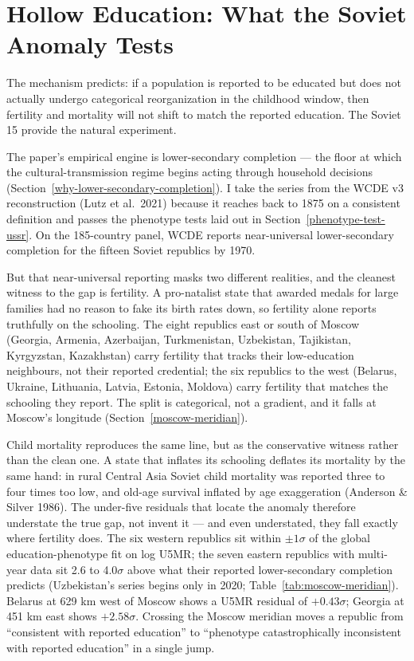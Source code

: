 \documentclass[12pt,letterpaper]{article}
\begin{document}
\section{Hollow Education: What the Soviet Anomaly Tests}\label{hollow-education}

The mechanism predicts: if a population is reported to be educated but does not actually undergo categorical reorganization in the childhood window, then fertility and mortality will not shift to match the reported education. The Soviet 15 provide the natural experiment.

The paper's empirical engine is lower-secondary completion --- the
floor at which the cultural-transmission regime begins acting
through household decisions
(Section~\ref{why-lower-secondary-completion}). I take the series
from the WCDE v3 reconstruction (Lutz et al.\ 2021) because it
reaches back to 1875 on a consistent definition and passes the
phenotype tests laid out in Section~\ref{phenotype-test-ussr}. On the 185-country panel,
WCDE reports near-universal lower-secondary completion for the
fifteen Soviet republics by 1970.

But that near-universal reporting masks two different realities, and
the cleanest witness to the gap is fertility. A pro-natalist state
that awarded medals for large families had no reason to fake its birth
rates down, so fertility alone reports truthfully on the schooling.
The eight republics east or south of Moscow (Georgia, Armenia,
Azerbaijan, Turkmenistan, Uzbekistan, Tajikistan, Kyrgyzstan,
Kazakhstan) carry fertility that tracks their low-education neighbours,
not their reported credential; the six republics to the west (Belarus,
Ukraine, Lithuania, Latvia, Estonia, Moldova) carry fertility that
matches the schooling they report. The split is categorical, not a
gradient, and it falls at Moscow's longitude (Section~\ref{moscow-meridian}).

Child mortality reproduces the same line, but as the conservative
witness rather than the clean one. A state that inflates its schooling
deflates its mortality by the same hand: in rural Central Asia Soviet
child mortality was reported three to four times too low, and old-age
survival inflated by age exaggeration (Anderson \& Silver 1986). The
under-five residuals that locate the anomaly therefore understate the
true gap, not invent it --- and even understated, they fall exactly
where fertility does. The six western republics sit within
$\pm 1\sigma$ of the global education-phenotype fit on log U5MR; the
seven eastern republics with multi-year data sit 2.6 to 4.0$\sigma$
above what their reported lower-secondary completion predicts
(Uzbekistan's series begins only in 2020; Table~\ref{tab:moscow-meridian}).
Belarus at 629 km west of Moscow shows a U5MR residual of
$+0.43\sigma$; Georgia at 451 km east shows $+2.58\sigma$. Crossing the
Moscow meridian moves a republic from ``consistent with reported
education'' to ``phenotype catastrophically inconsistent with reported
education'' in a single jump.
\end{document}
